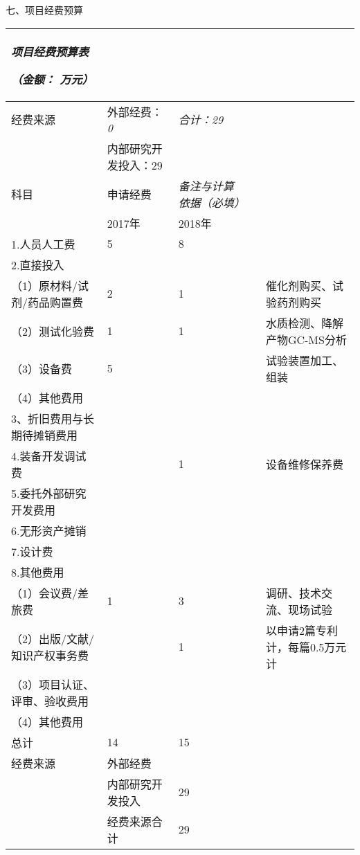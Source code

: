 七、项目经费预算

\begin{longtable}[]{@{}lllll@{}}
\toprule
\begin{minipage}[b]{0.17\columnwidth}\raggedright
\emph{\textbf{项目经费预算表}}

\emph{（金额： 万元）}\strut
\end{minipage} & \begin{minipage}[b]{0.17\columnwidth}\raggedright
\strut
\end{minipage} & \begin{minipage}[b]{0.17\columnwidth}\raggedright
\strut
\end{minipage} & \begin{minipage}[b]{0.17\columnwidth}\raggedright
\strut
\end{minipage} & \begin{minipage}[b]{0.17\columnwidth}\raggedright
\strut
\end{minipage}\tabularnewline
\midrule
\endhead
经费来源 & 外部经费： \emph{0} & \emph{合计：29} & &\tabularnewline
& 内部研究开发投入：29 & & &\tabularnewline
科目 & 申请经费 & \emph{备注与计算依据（必填）} & &\tabularnewline
& 2017年 & 2018年 & &\tabularnewline
1.人员人工费 & 5 & 8 & &\tabularnewline
2.直接投入 & & & &\tabularnewline
（1）原材料/试剂/药品购置费 & 2 & 1 & &
催化剂购买、试验药剂购买\tabularnewline
（2）测试化验费 & 1 & 1 & & 水质检测、降解产物GC-MS分析\tabularnewline
（3）设备费 & 5 & & & 试验装置加工、组装\tabularnewline
（4）其他费用 & & & &\tabularnewline
3、折旧费用与长期待摊销费用 & & & &\tabularnewline
4.装备开发调试费 & & 1 & & 设备维修保养费\tabularnewline
5.委托外部研究开发费用 & & & &\tabularnewline
6.无形资产摊销 & & & &\tabularnewline
7.设计费 & & & &\tabularnewline
8.其他费用 & & & &\tabularnewline
（1）会议费/差旅费 & 1 & 3 & & 调研、技术交流、现场试验\tabularnewline
（2）出版/文献/知识产权事务费 & & 1 & &
以申请2篇专利计，每篇0.5万元计\tabularnewline
（3）项目认证、评审、验收费用 & & & &\tabularnewline
（4）其他费用 & & & &\tabularnewline
总计 & 14 & 15 & &\tabularnewline
经费来源 & 外部经费 & & &\tabularnewline
& 内部研究开发投入 & 29 & &\tabularnewline
& 经费来源合计 & 29 & &\tabularnewline
\bottomrule
\end{longtable}
